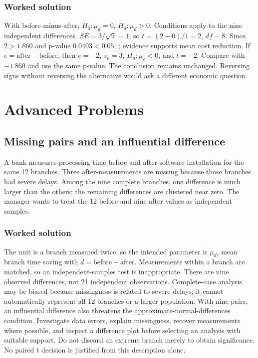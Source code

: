 \subsubsection*{Worked solution}\label{sol:direction}
With before-minus-after, $H_0:\mu_d=0$, $H_a:\mu_d>0$. Conditions apply to the nine independent differences. $SE=3/\sqrt9=1$, so $t=(2-0)/1=2$, $df=8$. Since $2>1.860$ and p-value $0.0403<0.05$, ; evidence supports mean cost reduction. If $e=\text{after}-\text{before}$, then $\bar e=-2$, $s_e=3$, $H_a:\mu_e<0$, and $t=-2$. Compare with $-1.860$ and use the same p-value. The conclusion remains unchanged. Reversing signs without reversing the alternative would ask a different economic question.
\section{Advanced Problems}\label{sec:advanced}
\subsection{Missing pairs and an influential difference}\label{prob:conditions}
A bank measures processing time before and after software installation for the same 12 branches. Three after-measurements are missing because those branches had severe delays. Among the nine complete branches, one difference is much larger than the others; the remaining differences are clustered near zero. The manager wants to treat the 12 before and nine after values as independent samples.
\subsubsection*{Worked solution}\label{sol:conditions}
The unit is a branch measured twice, so the intended parameter is $\mu_d$, mean branch time saving with $d=\text{before}-\text{after}$. Measurements within a branch are matched, so an independent-samples test is inappropriate. There are nine observed differences, not 21 independent observations. Complete-case analysis may be biased because missingness is related to severe delays; it cannot automatically represent all 12 branches or a larger population. With nine pairs, an influential difference also threatens the approximate-normal-differences condition. Investigate data errors, explain missingness, recover measurements where possible, and inspect a difference plot before selecting an analysis with suitable support. Do not discard an extreme branch merely to obtain significance. No paired t decision is justified from this description alone.


